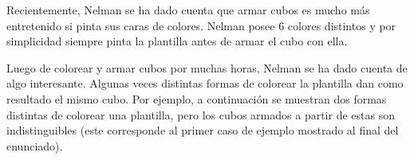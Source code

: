 \documentclass{oci}
\begin{document}
\begin{problemDescription}
\begin{center}
\begin{tikzpicture}[scale = 0.8]



\end{tikzpicture}
\end{center}

Recientemente, Nelman se ha dado cuenta que armar cubos es mucho más entretenido si pinta sus caras
de colores.
Nelman posee 6 colores distintos y por simplicidad siempre pinta la plantilla antes de armar el cubo
con ella.

Luego de colorear y armar cubos por muchas horas, Nelman se ha dado cuenta de algo interesante.
Algunas veces distintas formas de colorear la plantilla dan como resultado el mismo cubo.
Por ejemplo, a continuación se muestran dos formas distintas de colorear una plantilla, pero los cubos
armados a partir de estas son indistinguibles (este corresponde al primer caso de ejemplo mostrado
al final del enunciado).


\end{problemDescription}
\end{document}
